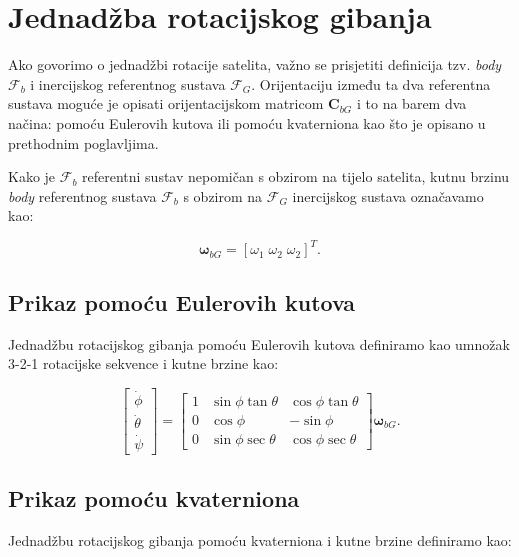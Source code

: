 \documentclass[times, utf8, diplomski, numeric]{templates/template}
\begin{document}
{    \section{Jednadžba rotacijskog gibanja}{
        Ako govorimo o jednadžbi rotacije satelita, važno se prisjetiti definicija tzv. \emph{body} $\mathcal{F}_b
        $ i inercijskog referentnog sustava $\mathcal{F}_G$. Orijentaciju između ta dva referentna sustava moguće je opisati orijentacijskom matricom $\boldsymbol{C}_{bG}$ i to na barem dva načina: pomoću Eulerovih kutova ili pomoću kvaterniona kao što je opisano u prethodnim poglavljima.

        Kako je $\mathcal{F}_b$ referentni sustav nepomičan s obzirom na tijelo satelita, kutnu brzinu \emph{body} referentnog sustava $\mathcal{F}_b$ s obzirom na $\mathcal{F}_G$ inercijskog sustava označavamo kao:

        \begin{equation}
            \boldsymbol{\omega}_{bG} = \left[ \omega_1 \; \omega_2 \; \omega_2\right]^T.
        \end{equation}

        \subsection{Prikaz pomoću Eulerovih kutova}{
            Jednadžbu rotacijskog gibanja pomoću Eulerovih kutova definiramo kao umnožak 3-2-1 rotacijske sekvence i kutne brzine kao:

            \begin{equation}
                \begin{bmatrix}
                    \dot{\phi} \\
                    \dot{\theta} \\
                    \dot{\psi}
                \end{bmatrix}
                =
                \begin{bmatrix}
                    1 & \sin\phi\tan\theta & \cos\phi\tan\theta \\
                    0 & \cos\phi & -\sin\phi \\
                    0 & \sin\phi\sec\theta & \cos\phi\sec\theta
                \end{bmatrix}
                \boldsymbol{\omega}_{bG}.
            \end{equation}
        }

        \subsection{Prikaz pomoću kvaterniona}{
            Jednadžbu rotacijskog gibanja pomoću kvaterniona i kutne brzine definiramo kao:

}}}
\end{document}
